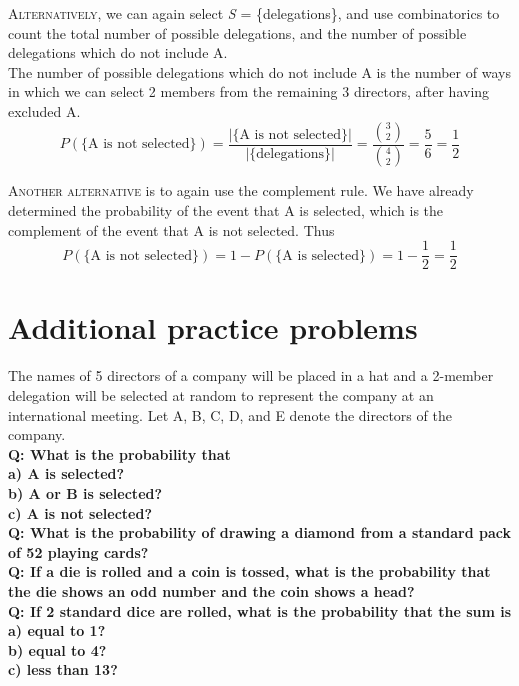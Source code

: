 \documentclass{article}
\begin{document}
\textsc{Alternatively}, we can again select \textsl{S} = \{delegations\}, and use combinatorics to count the total number of possible delegations, and the number of possible delegations which do not include A.\\[1ex]
The number of possible delegations which do not include A is the number of ways in which we can select 2 members from the remaining 3 directors, after having excluded A.
\begin{equation*}
P(\{\text{A is not selected}\})=\dfrac{|\{\text{A is not selected}\}|}{|\{\text{delegations}\}|}=\dfrac{\binom{3}{2}}{\binom{4}{2}}=\dfrac{5}{6}=\dfrac{1}{2}
\end{equation*}

\textsc{Another alternative} is to again use the complement rule. We have already determined the probability of the event that A is selected, which is the complement of the event that A is not selected. Thus
\begin{equation*}
P(\{\text{A is not selected}\})=1-P(\{\text{A is selected}\})=1-\dfrac{1}{2}=\dfrac{1}{2}
\end{equation*}

\section{\sc Additional practice problems}

The names of 5 directors of a company will be placed in a hat and a 2-member delegation will be selected at random to represent the company at an international meeting. Let A, B, C, D, and E denote the directors of the company.\\[1ex]
{\bf Q: What is the probability that\\[1ex]
a) A is selected?\\[1ex]
b) A or B is selected?\\[1ex]
c) A is not selected?}\\[1em]
{\bf Q: What is the probability of drawing a diamond from a standard pack of 52 playing cards?}\\[1em]
{\bf Q: If a die is rolled and a coin is tossed, what is the probability that the die shows an odd number and the coin shows a head?}\\[1em]
{\bf Q: If 2 standard dice are rolled, what is the probability that the sum is\\
a) equal to 1?\\[1ex]
b) equal to 4?\\[1ex]
c) less than 13?}
\end{document}
